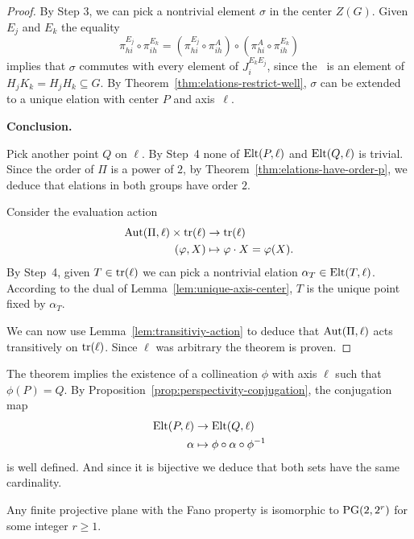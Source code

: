 \begin{proof}
    By Step 3, we can pick a nontrivial element $\sigma$ in the center $Z(G)$. Given $E_j$ and $E_k$ the equality
    \[
        \pi_{hi}^{E_j}\circ\pi_{ih}^{E_k}
            = (\pi_{hi}^{E_j}\circ\pi_{ih}^A)\circ
                (\pi_{hi}^A\circ\pi_{ih}^{E_k})
    \]
    implies that $\sigma$ commutes with every element of $J_i^{E_kE_j}$, since the \rhs\ is an element of $H_jK_k=H_jH_k\subseteq G$. By Theorem~\ref{thm:elations-restrict-well}, $\sigma$ can be extended to a unique elation with center $P$ and axis~$\ell$.
    
    \medskip

    \textbf{Conclusion.}

    Pick another point $Q$ on $\ell$. By Step~4 none of $\mathrm{Elt}(P,\ell)$ and $\mathrm{Elt}(Q,\ell)$ is trivial. Since the order of $\Pi$ is a power of $2$, by Theorem~\ref{thm:elations-have-order-p}, we deduce that elations in both groups have order $2$.
    
    Consider the evaluation action
    \begin{align*}
        \operatorname{Aut}(\Pi,\ell)\times\operatorname{tr}(\ell)&\to\operatorname{tr}(\ell)\\
        (\varphi,X) &\mapsto \varphi\cdot X=\varphi(X).
    \end{align*}
    By Step~4, given $T\in\operatorname{tr}(\ell)$ we can pick a nontrivial elation $\alpha_T\in\mathrm{Elt}(T,\ell)$. According to the dual of Lemma~\ref{lem:unique-axis-center}, $T$ is the unique point fixed by $\alpha_T$.

    We can now use Lemma~\ref{lem:transitiviy-action} to deduce that $\operatorname{Aut}(\Pi,\ell)$ acts transitively on $\operatorname{tr}(\ell)$. Since $\ell$ was arbitrary the theorem is proven.
    
\end{proof}

\begin{rem}
    The theorem implies the existence of a collineation $\phi$ with axis $\ell$ such that $\phi(P)=Q$. By Proposition~\ref{prop:perspectivity-conjugation}, the conjugation map
    \begin{align*}
        \mathrm{Elt}(P,\ell)&\to\mathrm{Elt}(Q,\ell)\\
        \alpha&\mapsto\phi\circ\alpha\circ\phi^{-1}
    \end{align*}
    is well defined. And since it is bijective we deduce that both sets have the same cardinality.
\end{rem}

\begin{cor} {\upshape[Gleason]}
    Any finite projective plane with the Fano property is isomorphic to\/ $\operatorname{PG}(2,2^r)$ for some integer\/ $r\ge 1$.
\end{cor}

